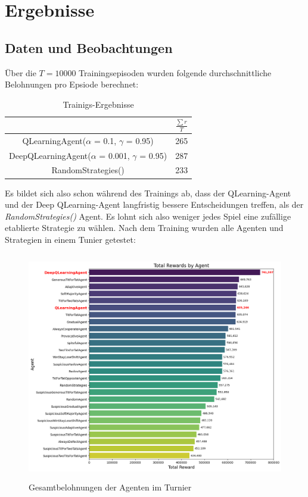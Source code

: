 \chapter{Ergebnisse}
\section{Daten und Beobachtungen}
Über die $T = 10000$ Trainingsepisoden wurden folgende durchschnittliche Belohnungen pro Epsiode berechnet:
\begin{table}[H]
    \centering
    \begin{tabular}{c|c}
            & $\frac{\sum r}{T}$ \\
        \hline
        QLearningAgent($\alpha$ = 0.1, $\gamma$ = 0.95)  & 265 \\
        \hline
        DeepQLearningAgent($\alpha$ = 0.001, $\gamma$ = 0.95) & 287 \\
        \hline
        RandomStrategies() & 233
    \end{tabular}
    \caption{Trainigs-Ergebnisse}
    \label{table:trainingsergebnisse}
\end{table}
Es bildet sich also schon während des Trainings ab, dass der QLearning-Agent und der Deep QLearning-Agent langfristig
bessere Entscheidungen treffen, als der \textit{RandomStrategies()} Agent. Es lohnt sich also weniger jedes Spiel
eine zufällige etablierte Strategie zu wählen.
Nach dem Training wurden alle Agenten und Strategien in einem Tunier getestet:
\begin{figure}[H]
    \centering
    \includegraphics[height=10cm]{../poster/logos/tournament.png}
    \caption{Gesamtbelohnungen der Agenten im Turnier}
    \label{fig:gesamtbelohnungen}
\end{figure}
